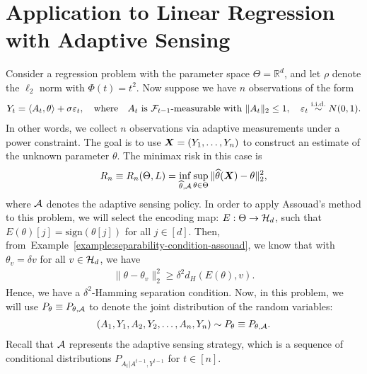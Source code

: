 \documentclass[12pt]{article}
\begin{document}
\section{Application to Linear Regression with Adaptive Sensing}
\label{sec:assouad-adaptive-sensing}

Consider a regression problem with the parameter space $\Theta = \mathbb{R}^d$, and let $\rho$ denote the $\ell_2$ norm with $\Phi(t) = t^2$. Now suppose we have $n$ observations of the form 
\begin{align}
Y_t = \langle A_t, \theta \rangle + \sigma \varepsilon_t, \quad \text{where} \quad A_t \text{ is } {\cal F}_{t-1}\text{-measurable with }   \|A_t\|_2 \leq 1, \quad \varepsilon_t \overset{\text{i.i.d.}}{\sim} N(0, 1).  
\end{align}
In other words, we collect $n$ observations via adaptive measurements under a power constraint. The goal is to use ${\boldsymbol X} = (Y_1, \ldots, Y_n)$ to construct an estimate of the unknown parameter $\theta$. The minimax risk in this case is 
\begin{align}
R_n \equiv R_n(\Theta, L) = \inf_{\widehat{\theta}, {\cal A}} \sup_{\theta \in \Theta} \|\widehat{\theta}({\boldsymbol X}) - \theta\|_2^2, 
\end{align}
where ${\cal A}$ denotes the adaptive sensing policy. In order to apply Assouad's method to this problem, we will select the encoding map: $E:\Theta \to {\cal H}_d$, such that $E(\theta)[j] = \mathrm{sign}(\theta[j])$ for all $j \in [d]$. Then, from~Example~\ref{example:separability-condition-assouad}, we know that with $\theta_v = \delta v$ for all $v \in {\cal H}_d$, we have 
\begin{align}
\|\theta - \theta_v\|_2^2 \geq \delta^2 d_H(E(\theta), v). 
\end{align}
Hence, we have a $\delta^2$-Hamming separation condition. Now, in this problem, we will use $P_\theta \equiv P_{\theta, {\cal A}}$ to denote the joint distribution of the random variables: 
\begin{align}
(A_1, Y_1, A_2, Y_2, \ldots, A_n, Y_n) \sim P_{\theta} \equiv P_{\theta, {\cal A}}. 
\end{align}
Recall that ${\cal A}$ represents the adaptive sensing strategy, which is a sequence of conditional distributions $P_{A_t|A^{t-1}, Y^{t-1}}$ for $t \in [n]$. 
\end{document}
